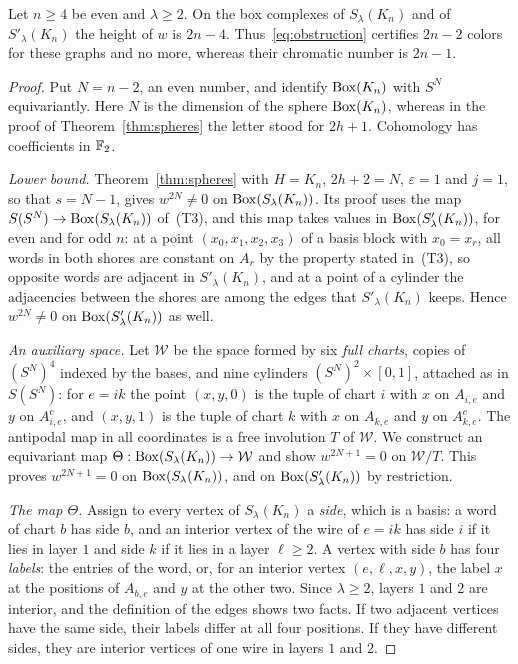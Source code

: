 \begin{proposition}\label{prop:even}
Let $n\ge4$ be even and $\lambda\ge2$. On the box complexes of $S_\lambda(K_n)$ and of $S'_\lambda(K_n)$ the height of $w$ is $2n-4$. Thus~\eqref{eq:obstruction} certifies $2n-2$ colors for these graphs and no more, whereas their chromatic number is $2n-1$.
\end{proposition}
\begin{proof}
Put $N=n-2$, an even number, and identify $\operatorname{Box}(K_n)$ with $S^N$ equivariantly. Here $N$ is the dimension of the sphere $\operatorname{Box}(K_n)$, whereas in the proof of Theorem~\ref{thm:spheres} the letter stood for $2h+1$. Cohomology has coefficients in $\mathbb F_2$.

\emph{Lower bound.} Theorem~\ref{thm:spheres} with $H=K_n$, $2h+2=N$, $\varepsilon=1$ and $j=1$, so that $s=N-1$, gives $w^{2N}\ne0$ on $\operatorname{Box}(S_\lambda(K_n))$. Its proof uses the map $S(S^N)\to\operatorname{Box}(S_\lambda(K_n))$ of~(T3), and this map takes values in $\operatorname{Box}(S'_\lambda(K_n))$, for even and for odd $n$: at a point $(x_0,x_1,x_2,x_3)$ of a basis block with $x_0=x_r$, all words in both shores are constant on $A_r$ by the property stated in~(T3), so opposite words are adjacent in $S'_\lambda(K_n)$, and at a point of a cylinder the adjacencies between the shores are among the edges that $S'_\lambda(K_n)$ keeps. Hence $w^{2N}\ne0$ on $\operatorname{Box}(S'_\lambda(K_n))$ as well.

\emph{An auxiliary space.} Let $\mathcal W$ be the space formed by six \emph{full charts}, copies of $(S^N)^4$ indexed by the bases, and nine cylinders $(S^N)^2\times[0,1]$, attached as in $S(S^N)$: for $e=ik$ the point $(x,y,0)$ is the tuple of chart $i$ with $x$ on $A_{i,e}$ and $y$ on $A_{i,e}^c$, and $(x,y,1)$ is the tuple of chart $k$ with $x$ on $A_{k,e}$ and $y$ on $A_{k,e}^c$. The antipodal map in all coordinates is a free involution $T$ of $\mathcal W$. We construct an equivariant map $\Theta:\operatorname{Box}(S_\lambda(K_n))\to\mathcal W$ and show $w^{2N+1}=0$ on $\mathcal W/T$. This proves $w^{2N+1}=0$ on $\operatorname{Box}(S_\lambda(K_n))$, and on $\operatorname{Box}(S'_\lambda(K_n))$ by restriction.

\emph{The map $\Theta$.} Assign to every vertex of $S_\lambda(K_n)$ a \emph{side}, which is a basis: a word of chart $b$ has side $b$, and an interior vertex of the wire of $e=ik$ has side $i$ if it lies in layer $1$ and side $k$ if it lies in a layer $\ell\ge2$. A vertex with side $b$ has four \emph{labels}: the entries of the word, or, for an interior vertex $(e,\ell,x,y)$, the label $x$ at the positions of $A_{b,e}$ and $y$ at the other two. Since $\lambda\ge2$, layers $1$ and $2$ are interior, and the definition of the edges shows two facts. If two adjacent vertices have the same side, their labels differ at all four positions. If they have different sides, they are interior vertices of one wire in layers $1$ and $2$.


\end{proof}
